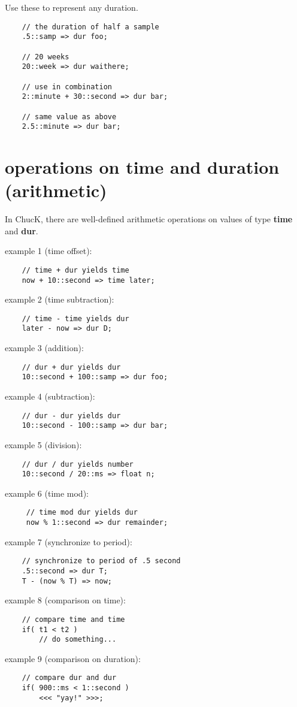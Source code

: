 Use these to represent any duration.

\begin{verbatim}
    // the duration of half a sample
    .5::samp => dur foo;

    // 20 weeks
    20::week => dur waithere;

    // use in combination
    2::minute + 30::second => dur bar;

    // same value as above
    2.5::minute => dur bar;
\end{verbatim}

\section{operations on time and duration (arithmetic)}

In ChucK, there are well-defined arithmetic operations on values of type {\bf time} and {\bf dur}.

example 1 (time offset):
\begin{verbatim}
    // time + dur yields time
    now + 10::second => time later;
\end{verbatim}

example 2 (time subtraction):
\begin{verbatim}
    // time - time yields dur
    later - now => dur D;
\end{verbatim}
example 3 (addition):
\begin{verbatim}
    // dur + dur yields dur
    10::second + 100::samp => dur foo;
\end{verbatim}
example 4 (subtraction):
\begin{verbatim}
    // dur - dur yields dur
    10::second - 100::samp => dur bar;
\end{verbatim}
example 5 (division):
\begin{verbatim}
    // dur / dur yields number
    10::second / 20::ms => float n;
\end{verbatim}
example 6 (time mod):
\begin{verbatim}
     // time mod dur yields dur
     now % 1::second => dur remainder;
\end{verbatim}
example 7 (synchronize to period):
\begin{verbatim}
    // synchronize to period of .5 second
    .5::second => dur T;
    T - (now % T) => now;
\end{verbatim}
example 8 (comparison on time):
\begin{verbatim}
    // compare time and time
    if( t1 < t2 )
        // do something...
\end{verbatim}
example 9 (comparison on duration):
\begin{verbatim}
    // compare dur and dur
    if( 900::ms < 1::second )
        <<< "yay!" >>>;
\end{verbatim}

